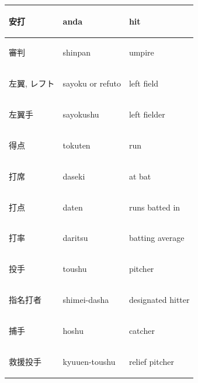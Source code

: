 \begin{tabular}{lll}
			\begin{CJK}{UTF8}{min}安打 \end{CJK} &anda                            & hit                 \\\hline
			\begin{CJK}{UTF8}{min}審判 \end{CJK} &shinpan                         & umpire              \\\hline
			\begin{CJK}{UTF8}{min}左翼,  レフト \end{CJK} &sayoku or refuto          & left field          \\\hline
			\begin{CJK}{UTF8}{min}左翼手 \end{CJK} &sayokushu                      & left fielder        \\\hline
			\begin{CJK}{UTF8}{min}得点 \end{CJK} &tokuten                         & run                 \\\hline
			\begin{CJK}{UTF8}{min}打席 \end{CJK} &daseki                          & at bat              \\\hline
			\begin{CJK}{UTF8}{min}打点 \end{CJK} &daten                           & runs batted in      \\\hline
			\begin{CJK}{UTF8}{min}打率 \end{CJK} &daritsu                         & batting average     \\\hline
			\begin{CJK}{UTF8}{min}投手 \end{CJK} &toushu                          & pitcher             \\\hline
			\begin{CJK}{UTF8}{min}指名打者 \end{CJK} &shimei-dasha                  & designated hitter   \\\hline
			\begin{CJK}{UTF8}{min}捕手 \end{CJK} &hoshu                           & catcher             \\\hline
			\begin{CJK}{UTF8}{min}救援投手 \end{CJK} &kyuuen-toushu                 & relief pitcher      \\\hline

\end{tabular}
